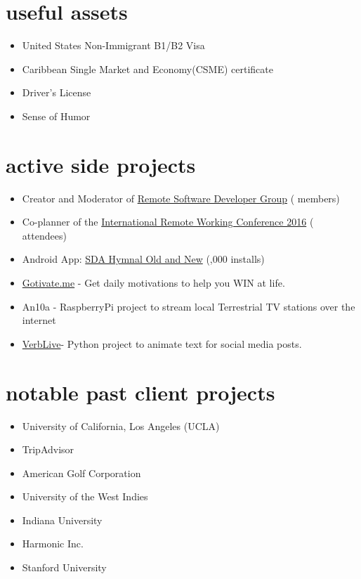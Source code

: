 \documentclass[]{friggeri-cv} %
\begin{document}

\section{useful assets}
\begin{itemize}
	\item United States Non-Immigrant B1/B2 Visa
    \item Caribbean Single Market and Economy(CSME) certificate
    \item Driver's License
    \item Sense of Humor
\end{itemize}


\section{active side projects}
\begin{itemize}
	\item Creator and Moderator of {\href{http://remotesoftwaredeveloper.com}{Remote Software Developer Group}} ( members)
    \item Co-planner of the {\href{http://remoteworkingconf.com}{International Remote Working Conference 2016}} ( attendees)
    \item Android App: {\href{https://play.google.com/store/apps/details?id=com.ionicframework.sdanewandoldhymnal816673&hl=en}{SDA Hymnal Old and New}} (,000 installs)
    \item {\href{http://gotivate.me}{Gotivate.me}} - Get daily motivations to help you WIN at life.
    \item An10a - RaspberryPi project to stream local Terrestrial TV stations over the internet
    \item {\href{http://verblive.exterbox.com}{VerbLive}}- Python project to animate text for social media posts.
\end{itemize}

\section{notable past client projects}
\begin{itemize}
	\item University of California, Los Angeles (UCLA)
    \item TripAdvisor
    \item American Golf Corporation
    \item University of the West Indies
    \item Indiana University
    \item Harmonic Inc.
    \item Stanford University
\end{itemize}
\end{document}
